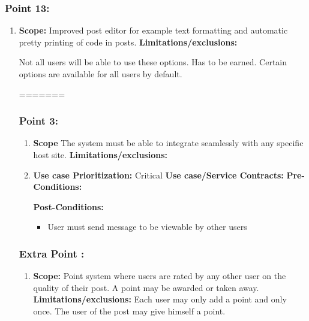 \documentclass[11pt]{article}
\begin{document}
\subsubsection{Point 13:} 
\begin{enumerate}
\item 
\textbf{Scope:}
Improved post editor for example text formatting and automatic pretty printing of code in posts.
\newline
\textbf{Limitations/exclusions:} 

Not all users will be able to use these options. Has to be earned. Certain options are available for all users by default.

=======
\subsubsection{Point 3:}
\begin{enumerate}
\item 
\textbf{Scope}
The system must be able to integrate seamlessly with any specific host site.
\newline
\textbf{Limitations/exclusions:}
\item
\textbf{Use case Prioritization:} Critical
\textbf{Use case/Service Contracts:} 
\newline
\textbf{Pre-Conditions: }
 

\textbf{Post-Conditions: }
\begin{itemize}
\item User must send message to be viewable by other users
\end{itemize}
\end{enumerate}


\subsubsection{Extra Point :} 
\begin{enumerate}
\item 
\textbf{Scope:}
Point system where users are rated by any other user on the quality of their post. A point may be awarded or taken away.
\newline
\textbf{Limitations/exclusions:} 
Each user may only add a point and only once. The user of the post may give himself a point.


\end{enumerate}
\end{enumerate}
\end{document}
